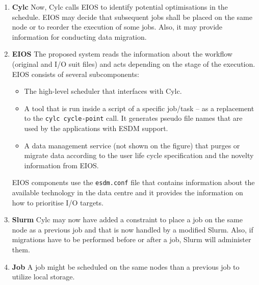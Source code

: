 \documentclass[a4paper]{article}
\begin{document}
\begin{enumerate}

  \item \textbf{Cylc}
  Now, Cylc calls EIOS to identify potential optimisations in the schedule.
  EIOS may decide that subsequent jobs shall be placed on the same node or to reorder the execution of some jobs.
  Also, it may provide information for conducting data migration.

  \item \textbf{EIOS}
  The proposed system reads the information about the workflow (original and I/O suit files) and acts depending on the stage of the execution.
  EIOS consists of several subcomponents:
    \begin{itemize}
      \item The high-level scheduler that interfaces with Cylc.
      \item A tool that is run inside a script of a specific job/task -- as a replacement to the \texttt{cylc cycle-point} call.
      It generates pseudo file names that are used by the applications with ESDM support.
      \item A data management service (not shown on the figure) that purges or migrate data according to the user life cycle specification and the novelty information from EIOS.
    \end{itemize}
  EIOS components use the \texttt{esdm.conf} file that contains information about the available technology in the data centre and it provides the information on how to prioritise I/O targets.


  \item \textbf{Slurm}
  Cylc may now have added a constraint to place a job on the same node as a previous job and that is now handled by a modified Slurm.
  Also, if migrations have to be performed before or after a job, Slurm will administer them.

  \item \textbf{Job}
  A job might be scheduled on the same nodes than a previous job to utilize local storage.


\end{enumerate}
\end{document}
